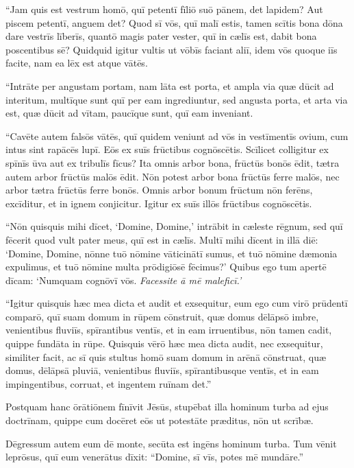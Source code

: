 \Versus ``Jam quis est vestrum homō, quī petentī fīliō suō pānem, det lapidem? 
\Versus Aut piscem petentī, anguem det? 
\Versus Quod sī vōs, quī malī estis, tamen scītis bona dōna dare vestrīs līberīs, quantō magis pater vester, quī in cælīs est, dabit bona poscentibus sē? 
\Versus Quidquid igitur vultis ut vōbīs faciant aliī, idem vōs quoque iīs facite, nam ea lēx est atque vātēs.

\Versus ``Intrāte per angustam portam, nam lāta est porta, et ampla via quæ dūcit ad interitum, multīque sunt quī per eam ingrediuntur, 
\Versus sed angusta porta, et arta via est, quæ dūcit ad vītam, paucīque sunt, quī eam inveniant.

\Versus ``Cavēte autem falsōs vātēs, quī quidem veniunt ad vōs in vestīmentīs ovium, cum intus sint rapācēs lupī. 
\Versus Eōs ex suīs frūctibus cognōscētis. Scīlicet colligitur ex spīnīs ūva aut ex tribulīs fīcus? 
\Versus Ita omnis arbor bona, frūctūs bonōs ēdit, tætra autem arbor frūctūs malōs ēdit. 
\Versus Nōn potest arbor bona frūctūs ferre malōs, nec arbor tætra frūctūs ferre bonōs. 
\Versus Omnis arbor bonum frūctum nōn ferēns, excīditur, et in ignem conjicitur. 
\Versus Igitur ex suīs illōs frūctibus cognōscētis.

\Versus ``Nōn quisquis mihi dīcet, `Domine, Domine,' intrābit in cæleste rēgnum, sed quī fēcerit quod vult pater meus, quī est in cælīs. 
\Versus Multī mihi dīcent in illā diē: `Domine, Domine, nōnne tuō nōmine vāticinātī sumus, et tuō nōmine dæmonia expulimus, et tuō nōmine multa prōdigiōsē fēcimus?' 
\Versus Quibus ego tum apertē dīcam: `Numquam cognōvī vōs. \emph{Facessite ā mē maleficī.'}

\Versus ``Igitur quisquis hæc mea dicta et audit et exsequitur, eum ego cum virō prūdentī comparō, quī suam domum in rūpem cōnstruit,
\Versus quæ domus dēlāpsō imbre, venientibus fluviīs, spīrantibus ventīs, et in eam irruentibus, nōn tamen cadit, quippe fundāta in rūpe.
\Versus Quisquis vērō hæc mea dicta audit, nec exsequitur, similiter facit, ac sī quis stultus homō suam domum in arēnā cōnstruat,
\Versus quæ domus, dēlāpsā pluviā, venientibus fluviīs, spīrantibusque ventīs, et in eam impingentibus, corruat, et ingentem ruīnam det.''

\Versus Postquam hanc ōrātiōnem fīnīvit Jēsūs, stupēbat illa hominum turba ad ejus doctrīnam, 
\Versus quippe cum docēret eōs ut potestāte præditus, nōn ut scrībæ.
 

\Caput
\Versus Dēgressum autem eum dē monte, secūta est ingēns hominum turba. 
\Versus Tum vēnit leprōsus, quī eum venerātus dīxit: ``Domine, sī vīs, potes mē mundāre.''

